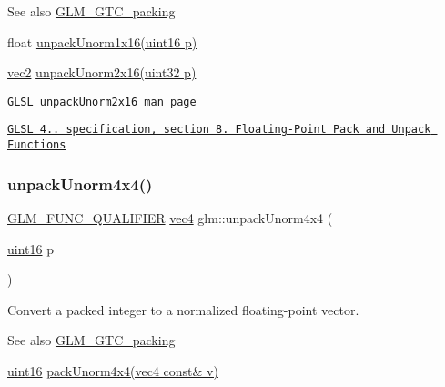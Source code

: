 \begin{DoxySeeAlso}{See also}
\hyperlink{group__gtc__packing}{G\+L\+M\+\_\+\+G\+T\+C\+\_\+packing} 

float \hyperlink{group__gtc__packing_ga7770e3ade4f4764cc1b2eb42ac4ec188}{unpack\+Unorm1x16(uint16 p)} 

\hyperlink{group__core__types_gaa1618f51db67eaa145db101d8c8431d8}{vec2} \hyperlink{group__core__func__packing_ga1f66188e5d65afeb9ffba1ad971e4007}{unpack\+Unorm2x16(uint32 p)} 

\href{http://www.opengl.org/sdk/docs/manglsl/xhtml/unpackUnorm2x16.xml}{\tt G\+L\+SL unpack\+Unorm2x16 man page} 

\href{http://www.opengl.org/registry/doc/GLSLangSpec.4.20.8.pdf}{\tt G\+L\+SL 4.. specification, section 8. Floating-\/\+Point Pack and Unpack Functions} 
\end{DoxySeeAlso}
\mbox{\label{group__gtc__packing_ga38a0a518d53e15a9481c31dc1e574a40}} 
\subsubsection{\texorpdfstring{unpack\+Unorm4x4()}{unpackUnorm4x4()}}
{\footnotesize\ttfamily \hyperlink{setup_8hpp_a33fdea6f91c5f834105f7415e2a64407}{G\+L\+M\+\_\+\+F\+U\+N\+C\+\_\+\+Q\+U\+A\+L\+I\+F\+I\+ER} \hyperlink{group__core__types_ga5881b1b022d7fd1b7218f5916532dd02}{vec4} glm\+::unpack\+Unorm4x4 (\begin{DoxyParamCaption}\item[{\hyperlink{group__gtc__type__precision_gad8c2939e1fdd8e5828b31d95c52255d5}{uint16}}]{p }\end{DoxyParamCaption})}

Convert a packed integer to a normalized floating-\/point vector.

\begin{DoxySeeAlso}{See also}
\hyperlink{group__gtc__packing}{G\+L\+M\+\_\+\+G\+T\+C\+\_\+packing} 

\hyperlink{group__gtc__type__precision_gad8c2939e1fdd8e5828b31d95c52255d5}{uint16} \hyperlink{group__gtc__packing_gad493c9f130e91dd8a4b360b05dcea573}{pack\+Unorm4x4(vec4 const\& v)} 
\end{DoxySeeAlso}
